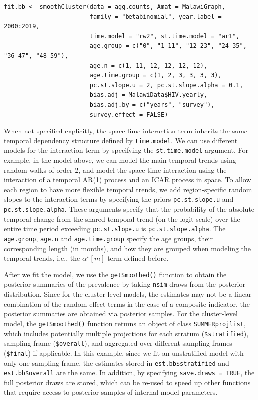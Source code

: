 \begin{verbatim}
fit.bb <- smoothCluster(data = agg.counts, Amat = MalawiGraph, 
                        family = "betabinomial", year.label = 2000:2019, 
                        time.model = "rw2", st.time.model = "ar1",
                        age.group = c("0", "1-11", "12-23", "24-35", "36-47", "48-59"),
                        age.n = c(1, 11, 12, 12, 12, 12), 
                        age.time.group = c(1, 2, 3, 3, 3, 3),
                        pc.st.slope.u = 2, pc.st.slope.alpha = 0.1,
                        bias.adj = MalawiData$HIV.yearly, 
                        bias.adj.by = c("years", "survey"),
                        survey.effect = FALSE)
\end{verbatim}

When not specified explicitly, the space-time interaction term inherits the same temporal dependency structure defined by \texttt{time.model}. We can use different models for the interaction term by specifying the \texttt{st.time.model} argument. For example, in the model above, we can model the main temporal trends using random walks of order 2, and model the space-time interaction using the interaction of a temporal AR(1) process and an ICAR process in space. To allow each region to have more flexible temporal trends, we add region-specific random slopes to the interaction terms by specifying the priors \texttt{pc.st.slope.u} and \texttt{pc.st.slope.alpha}. These arguments specify that the probability of the absolute temporal change from the shared temporal trend (on the logit scale) over the entire time period exceeding \texttt{pc.st.slope.u} is \texttt{pc.st.slope.alpha}. The \texttt{age.group}, \texttt{age.n} and \texttt{age.time.group} specify the age groups, their corresponding length (in months), and how they are grouped when modeling the temporal trends, i.e., the \(\alpha^\star[m]\) term defined before.

After we fit the model, we use the \texttt{getSmoothed()} function to obtain the posterior summaries of the prevalence by taking \texttt{nsim} draws from the posterior distribution. Since for the cluster-level models, the estimates may not be a linear combination of the random effect terms in the case of a composite indicator, the posterior summaries are obtained via posterior samples. For the cluster-level model, the \texttt{getSmoothed()} function returns an object of class \texttt{SUMMERprojlist}, which includes potentially multiple projections for each stratum (\texttt{\$stratified}), sampling frame (\texttt{\$overall}), and aggregated over different sampling frames (\texttt{\$final}) if applicable. In this example, since we fit an unstratified model with only one sampling frame, the estimates stored in \texttt{est.bb\$stratified} and \texttt{est.bb\$overall} are the same. In addition, by specifying \texttt{save.draws\ =\ TRUE}, the full posterior draws are stored, which can be re-used to speed up other functions that require access to posterior samples of internal model parameters.

